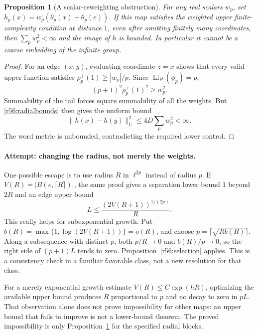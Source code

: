 \documentclass[11pt,a4paper]{article}
\newtheorem{notebookproposition}[notebooklemma]{Proposition}
\numberwithin{equation}{section}
\begin{document}
\begin{notebookproposition}[A scalar-reweighting obstruction]\label{r56:obstruction}
For any real scalars $w_p$, set
$h_p(x)=w_p(\theta_p(x)-\theta_p(e))$. If this map satisfies the weighted upper finite-complexity condition at distance $1$, even after omitting finitely many coordinates, then $\sum_pw_p^2<\infty$ and the image of $h$ is bounded. In particular it cannot be a coarse embedding of the infinite group.
\end{notebookproposition}
\begin{proof}
For an edge $(x,y)$, evaluating coordinate $z=x$ shows that every valid upper function satisfies $\rho_p^+(1)\geq|w_p|/p$. Since $\operatorname{Lip}(\phi_p)=p$,
\[
 (p+1)^2\rho_p^+(1)^2\geq w_p^2.
\]
Summability of the tail forces square summability of all the weights. But \eqref{r56:radialbounds} then gives the uniform bound
\[
 \|h(x)-h(y)\|_U^2\leq4D\sum_pw_p^2<\infty.
\]
The word metric is unbounded, contradicting the required lower control.
\end{proof}

\paragraph{Attempt: changing the radius, not merely the weights.}
One possible escape is to use radius $R$ in $\ell^{2p}$ instead of radius $p$. If $V(R)=|B(e,\lceil R\rceil)|$, the same proof gives a separation lower bound $1$ beyond $2R$ and an edge upper bound
\begin{equation}\label{r56:larger-radius}
 L\leq\frac{(2V(R+1))^{1/(2p)}}{R}.
\end{equation}
This really helps for subexponential growth. Put
$b(R)=\max\{1,\log(2V(R+1))\}=o(R)$, and choose
$p=\lceil\sqrt{Rb(R)}\rceil$. Along a subsequence with distinct $p$, both $p/R\to0$ and $b(R)/p\to0$, so the right side of $(p+1)L$ tends to zero. Proposition~\ref{r56:selection} applies. This is a consistency check in a familiar favorable class, not a new resolution for that class.

For a merely exponential growth estimate $V(R)\leq C\exp(hR)$, optimizing the available upper bound produces $R$ proportional to $p$ and no decay to zero in $pL$. That observation alone does not prove impossibility for other maps: an upper bound that fails to improve is not a lower-bound theorem. The proved impossibility is only Proposition~\ref{r56:obstruction} for the specified radial blocks.
\end{document}
